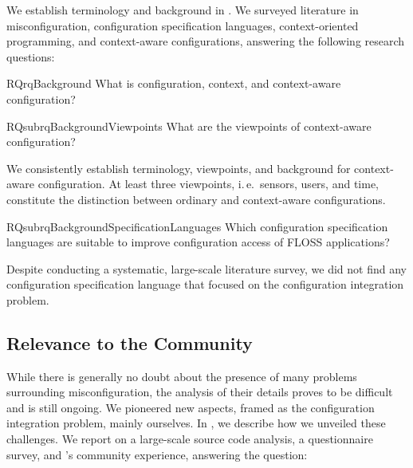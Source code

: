 We establish terminology and background in .
We surveyed literature in misconfiguration, configuration specification languages, context-oriented programming, and context-aware configurations, answering the following research questions:

\begin{restatable}{RQ}{rqBackground}
 \label{rq:background}
What is configuration, context, and context-aware configuration?
\end{restatable}

\begin{restatable}{RQsub}{rqBackgroundViewpoints}
 \label{rq:background-viewpoints}
What are the viewpoints of context-aware configuration?
\end{restatable}

\begin{contribution}
We consistently establish terminology, viewpoints, and background for context-aware configuration.
At least three viewpoints, i.\,e.\ sensors, users, and time, constitute the distinction between ordinary and context-aware configurations.
\end{contribution}

\begin{restatable}{RQsub}{rqBackgroundSpecificationLanguages}
 \label{rq:background-specification-languages}
 Which configuration specification languages are suitable to improve configuration access of FLOSS applications?
\end{restatable}

\begin{contribution}
Despite conducting a systematic, large-scale literature survey, we did not find any configuration specification language that focused on the configuration integration problem.
\end{contribution}

\subsection{Relevance to the Community}

While there is generally no doubt about the presence of many problems surrounding misconfiguration, the analysis of their details proves to be difficult and is still ongoing.
We pioneered new aspects, framed as the configuration integration problem, mainly ourselves.
In , we describe how we unveiled these challenges.
We report on a large-scale source code analysis, a questionnaire survey, and \elektra{}'s community experience, answering the question:

